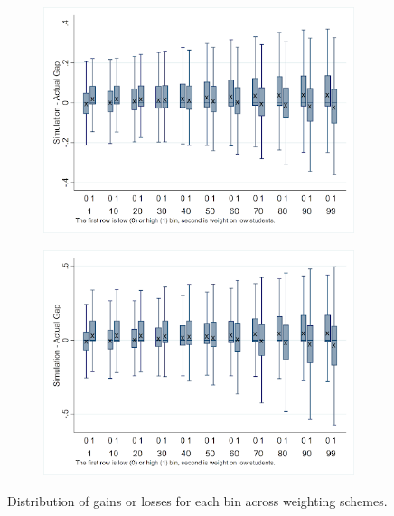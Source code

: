 \documentclass[12pt]{article}
\theoremstyle{definition}
\theoremstyle{definition}
\theoremstyle{definition}
\theoremstyle{definition}
\begin{document}
  \begin{figure}[H]
    \centering
     \begin{subfigure}[b]{0.45\textwidth}
        \includegraphics[width=1\textwidth]{Working_Paper/WP_Figures/ela_winners_losers.png}
    \end{subfigure}
     \begin{subfigure}[b]{0.45\textwidth}
        \includegraphics[width=1\textwidth]{Working_Paper/WP_Figures/Math_winners_losers.png}
    \end{subfigure}
    
    \label{fig:win_lose}
    \caption{Distribution of gains or losses for each bin across weighting schemes.}
\end{figure}
\end{document}
